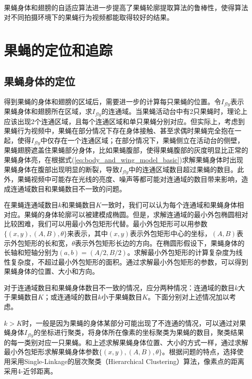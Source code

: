 果蝇身体和翅膀的自适应算法进一步提高了果蝇轮廓提取算法的鲁棒性，使得算法对不同拍摄环境下的果蝇行为视频都能取得较好的结果。

\section{果蝇的定位和追踪} \label{sec:fly_discrimination_and_track}

\subsection{果蝇身体的定位}\label{sec:fly_locate}

得到果蝇的身体和翅膀的区域后，需要进一步的计算每只果蝇的位置。令$I_{fly}$表示果蝇身体和翅膀所在区域，求$I_{fly}$的连通域。当果蝇活动台中有2只果蝇时，理论上应该出现2个连通区域，且每个连通区域和单只果蝇分别对应。但实际上，考虑到果蝇行为视频中，果蝇在部分情况下存在身体接触、甚至求偶时果蝇完全抱在一起，使得$I_{fly}$中仅存在一个连通区域；在部分情况下，果蝇侧立在活动台的侧壁，果蝇翅膀遮盖住果蝇部分身体，比如果蝇腹部，使得果蝇腹部的灰度明显比正常的果蝇身体亮，在根据式(\ref{eq:body_and_wing_model_basic})求解果蝇身体时出现果蝇身体在腹部出现明显的断裂，导致$I_{fly}$中的连通区域数目超过果蝇的数目。此外，果蝇视频中可能存在光线的亮度、噪声等都可能对连通域的数目带来影响，造成连通域数目和果蝇数目不一致的问题。

在果蝇连通域数目$k$和果蝇数目$K$一致时，我们可以认为每个连通域和果蝇身体相对应。果蝇的身体轮廓可以被建模成椭圆\cite{chexiangqian}。但是，求解连通域的最小外包椭圆相对比较困难，我们可以用最小外包矩形代替。最小外包矩形可以用参数$\{(x, y), (A, B), \theta\}$来表示，其中$(x, y)$表示外包矩形中心的坐标，$(A, B)$表示外包矩形的长和宽，$\theta$表示外包矩形长边的方向。在椭圆形假设下，果蝇身体的长轴和短轴分别为$(a, b) = (A/2, B/2)$。求解最小外包矩形的计算复杂度为线性复杂度，不超过最小外包矩形的面积\cite{Freeman:1975:DME:360881.360919}。通过求解最小外包矩形的参数，可以得到果蝇身体的位置、大小和方向。

对于连通域数目和果蝇身体数目不一致的情况，应分两种情况：连通域的数目$k$大于果蝇数目$K$；或连通域的数目$k$小于果蝇数目$K$。下面分别对上述情况加以考虑。

$k>K$时，一般是因为果蝇的身体某部分可能出现了不连通的情况，可以通过对果蝇身体$I_{fly}$的坐标进行聚类，将身体所在像素的坐标聚类为果蝇的数目，聚类结果的每一类别对应一只果蝇。和上述求解果蝇身体位置、大小的方式一样，通过求解最小外包矩形求解果蝇身体参数$\{(x, y), (A, B), \theta\}$。根据问题的特点，选择使用采用Single-Linkage的层次聚类（Hierarchical Clustering）算法\cite{rokach2005clustering}，像素点的距离采用4-近邻距离。

